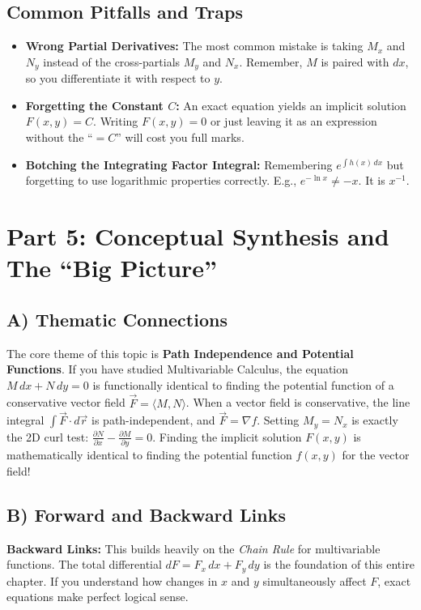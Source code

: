 \documentclass[11pt]{article}
\begin{document}
\subsection*{Common Pitfalls and Traps}
\begin{itemize}
    \item \textbf{Wrong Partial Derivatives:} The most common mistake is taking $M_x$ and $N_y$ instead of the cross-partials $M_y$ and $N_x$. Remember, $M$ is paired with $dx$, so you differentiate it with respect to $y$.
    \item \textbf{Forgetting the Constant $C$:} An exact equation yields an implicit solution $F(x, y) = C$. Writing $F(x, y) = 0$ or just leaving it as an expression without the ``$= C$'' will cost you full marks.
    \item \textbf{Botching the Integrating Factor Integral:} Remembering $e^{\int h(x) \, dx}$ but forgetting to use logarithmic properties correctly. E.g., $e^{-\ln x} \neq -x$. It is $x^{-1}$.
\end{itemize}

\newpage
\section*{Part 5: Conceptual Synthesis and The ``Big Picture''}

\subsection*{A) Thematic Connections}
The core theme of this topic is \textbf{Path Independence and Potential Functions}. If you have studied Multivariable Calculus, the equation $M \, dx + N \, dy = 0$ is functionally identical to finding the potential function of a conservative vector field $\vec{F} = \langle M, N \rangle$. When a vector field is conservative, the line integral $\int \vec{F} \cdot d\vec{r}$ is path-independent, and $\vec{F} = \nabla f$. Setting $M_y = N_x$ is exactly the 2D curl test: $\frac{\partial N}{\partial x} - \frac{\partial M}{\partial y} = 0$. Finding the implicit solution $F(x, y)$ is mathematically identical to finding the potential function $f(x, y)$ for the vector field!

\subsection*{B) Forward and Backward Links}
\textbf{Backward Links:} This builds heavily on the \textit{Chain Rule} for multivariable functions. The total differential $dF = F_x \, dx + F_y \, dy$ is the foundation of this entire chapter. If you understand how changes in $x$ and $y$ simultaneously affect $F$, exact equations make perfect logical sense.
\end{document}
